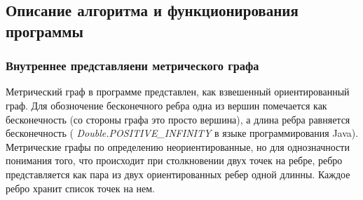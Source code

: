 \documentclass{../TechDoc}
\begin{document}
	\subsection {Описание алгоритма и функционирования программы}
	\subsubsection{Внутреннее представляени метрического графа}
		Метрический граф в программе представлен, как взвешенный ориентированный граф.
		Для обозночение бесконечного ребра одна из вершин помечается как бесконечность (со стороны графа это просто вершина), а длина ребра равняется бесконечность ( \textit{Double.POSITIVE\_INFINITY} в языке программирования Java).
		Метрические графы по определению неориентированные, но для однозначности понимания того, что происходит при столкновении двух точек на ребре, ребро представляется как пара из двух ориентированных ребер одной длинны.
		Каждое ребро хранит список точек на нем.
\end{document}
